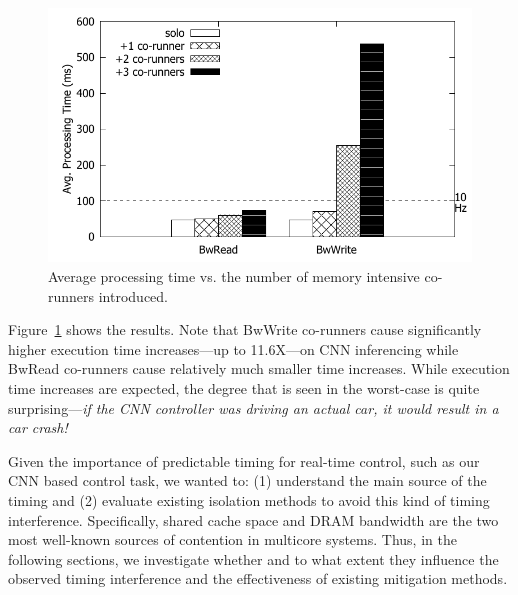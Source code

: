 \begin{figure}[h]
  \centering
  \includegraphics[width=.45\textwidth]{figs/perf_vs_bandwidth}
  \caption{Average processing time vs. the number of memory
    intensive co-runners introduced.}
  \label{fig:perf_vs_bandwidth}
\end{figure}


Figure~\ref{fig:perf_vs_bandwidth} shows the results. Note
that BwWrite co-runners cause significantly higher execution time
increases---up to 11.6X---on CNN inferencing while BwRead co-runners
cause relatively much smaller time increases. While execution time
increases are expected, the degree that is seen in the worst-case 
is quite surprising---\emph{if the CNN controller was driving an actual 
car, it would result in a car crash!}

Given the importance of predictable timing for real-time control, such
as our CNN based control task, we wanted to: (1) understand the main
source of the timing and (2) evaluate existing isolation methods to
avoid this kind of timing interference. Specifically, shared cache
space and DRAM bandwidth are the two most well-known sources of contention
in multicore systems. Thus, in the following sections, we investigate whether
and to what extent they influence the observed timing interference and 
the effectiveness of existing mitigation methods.



